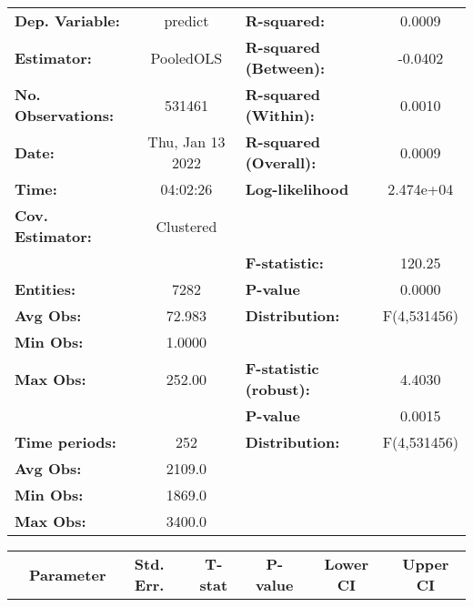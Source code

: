 \begin{center}
\begin{tabular}{lclc}
\toprule
\textbf{Dep. Variable:}    &      predict       & \textbf{  R-squared:         }   &      0.0009      \\
\textbf{Estimator:}        &     PooledOLS      & \textbf{  R-squared (Between):}  &     -0.0402      \\
\textbf{No. Observations:} &       531461       & \textbf{  R-squared (Within):}   &      0.0010      \\
\textbf{Date:}             &  Thu, Jan 13 2022  & \textbf{  R-squared (Overall):}  &      0.0009      \\
\textbf{Time:}             &      04:02:26      & \textbf{  Log-likelihood     }   &    2.474e+04     \\
\textbf{Cov. Estimator:}   &     Clustered      & \textbf{                     }   &                  \\
\textbf{}                  &                    & \textbf{  F-statistic:       }   &      120.25      \\
\textbf{Entities:}         &        7282        & \textbf{  P-value            }   &      0.0000      \\
\textbf{Avg Obs:}          &       72.983       & \textbf{  Distribution:      }   &   F(4,531456)    \\
\textbf{Min Obs:}          &       1.0000       & \textbf{                     }   &                  \\
\textbf{Max Obs:}          &       252.00       & \textbf{  F-statistic (robust):} &      4.4030      \\
\textbf{}                  &                    & \textbf{  P-value            }   &      0.0015      \\
\textbf{Time periods:}     &        252         & \textbf{  Distribution:      }   &   F(4,531456)    \\
\textbf{Avg Obs:}          &       2109.0       & \textbf{                     }   &                  \\
\textbf{Min Obs:}          &       1869.0       & \textbf{                     }   &                  \\
\textbf{Max Obs:}          &       3400.0       & \textbf{                     }   &                  \\
\bottomrule
\end{tabular}
\begin{tabular}{lcccccc}
                & \textbf{Parameter} & \textbf{Std. Err.} & \textbf{T-stat} & \textbf{P-value} & \textbf{Lower CI} & \textbf{Upper CI}  \\

\end{tabular}
\end{center}
